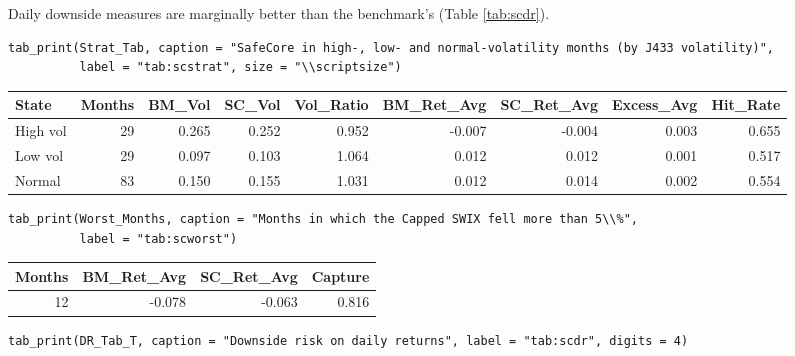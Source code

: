 \documentclass[11pt,preprint]{elsarticle}
\let\origtable\table
\let\endorigtable\endtable
\renewenvironment{table}[1][2] {
    \expandafter\origtable\expandafter[H]
} {
    \endorigtable
}
\numberwithin{equation}{section}
\numberwithin{figure}{section}
\numberwithin{table}{section}
\begin{document}
Daily downside measures are marginally better than the benchmark's
(Table \ref{tab:scdr}).

\begin{verbatim}
tab_print(Strat_Tab, caption = "SafeCore in high-, low- and normal-volatility months (by J433 volatility)",
          label = "tab:scstrat", size = "\\scriptsize")
\end{verbatim}

\begin{table}[!htbp]
\centering
\caption{SafeCore in high-, low- and normal-volatility months (by J433 volatility)} 
\label{tab:scstrat}
\begingroup\scriptsize
\begin{tabular}{lrrrrrrrr}
  \hline
State & Months & BM\_Vol & SC\_Vol & Vol\_Ratio & BM\_Ret\_Avg & SC\_Ret\_Avg & Excess\_Avg & Hit\_Rate \\ 
  \hline
High vol &   29 & 0.265 & 0.252 & 0.952 & -0.007 & -0.004 & 0.003 & 0.655 \\ 
  Low vol &   29 & 0.097 & 0.103 & 1.064 & 0.012 & 0.012 & 0.001 & 0.517 \\ 
  Normal &   83 & 0.150 & 0.155 & 1.031 & 0.012 & 0.014 & 0.002 & 0.554 \\ 
   \hline
\end{tabular}
\endgroup
\end{table}

\begin{verbatim}
tab_print(Worst_Months, caption = "Months in which the Capped SWIX fell more than 5\\%",
          label = "tab:scworst")
\end{verbatim}

\begin{table}[!htbp]
\centering
\caption{Months in which the Capped SWIX fell more than 5\%} 
\label{tab:scworst}
\begingroup\footnotesize
\begin{tabular}{rrrr}
  \hline
Months & BM\_Ret\_Avg & SC\_Ret\_Avg & Capture \\ 
  \hline
  12 & -0.078 & -0.063 & 0.816 \\ 
   \hline
\end{tabular}
\endgroup
\end{table}

\begin{verbatim}
tab_print(DR_Tab_T, caption = "Downside risk on daily returns", label = "tab:scdr", digits = 4)
\end{verbatim}
\end{document}

